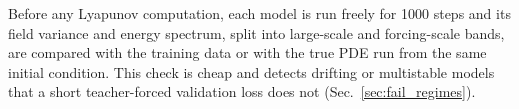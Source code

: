 Before any Lyapunov computation, each model is run freely for 1000
steps and its field variance and energy spectrum, split into large-scale
and forcing-scale bands, are compared with the training data or with the
true PDE run from the same initial condition.
This check is cheap and detects drifting or multistable models that a
short teacher-forced validation loss does not (Sec.~\ref{sec:fail_regimes}).
